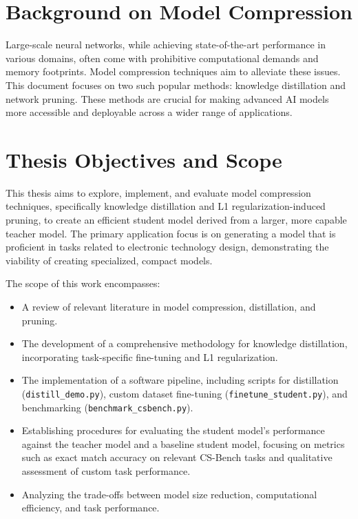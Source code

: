 \documentclass[12pt, a4paper]{report}
\begin{document}
\section{Background on Model Compression}
\label{sec:background_compression}
Large-scale neural networks, while achieving state-of-the-art performance in various domains, often come with prohibitive computational demands and memory footprints. Model compression techniques aim to alleviate these issues. This document focuses on two such popular methods: knowledge distillation and network pruning. These methods are crucial for making advanced AI models more accessible and deployable across a wider range of applications.

\section{Thesis Objectives and Scope}
\label{sec:objectives_scope}
This thesis aims to explore, implement, and evaluate model compression techniques, specifically knowledge distillation and L1 regularization-induced pruning, to create an efficient student model derived from a larger, more capable teacher model. The primary application focus is on generating a model that is proficient in tasks related to electronic technology design, demonstrating the viability of creating specialized, compact models.

The scope of this work encompasses:
\begin{itemize}
    \item A review of relevant literature in model compression, distillation, and pruning.
    \item The development of a comprehensive methodology for knowledge distillation, incorporating task-specific fine-tuning and L1 regularization.
    \item The implementation of a software pipeline, including scripts for distillation (\texttt{distill\_demo.py}), custom dataset fine-tuning (\texttt{finetune\_student.py}), and benchmarking (\texttt{benchmark\_csbench.py}).
    \item Establishing procedures for evaluating the student model's performance against the teacher model and a baseline student model, focusing on metrics such as exact match accuracy on relevant CS-Bench tasks and qualitative assessment of custom task performance.
    \item Analyzing the trade-offs between model size reduction, computational efficiency, and task performance.
\end{itemize}
\end{document}
